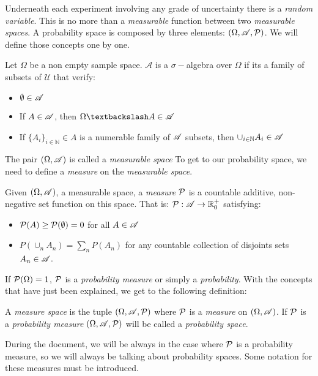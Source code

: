 
Underneath each experiment involving any grade of uncertainty there is a \emph{random variable}. This is no more than a \emph{measurable} function between two \emph{measurable spaces}.
A probability space is composed by three elements: $(\Omega, \mathscr{A}, \mathcal{P})$. We will define those concepts one by one.

\begin{ndef}Let $\Omega$ be a non empty sample space. $\mathcal A$ is a $\sigma-$algebra over $\Omega$ if its a family of subsets of $\mathcal U$ that verify:
\begin{itemize}
  \item $\emptyset \in \mathscr{A}$
  \item If $A \in \mathscr{A}$, then $\Omega \textbackslash A \in \Alg$
  \item If $\{A_i\}_{i \in \mathbb N} \in A$ is a numerable family of $\mathscr{A}$ subsets, then $\cup_{i \in \mathbb N} A_i \in \mathscr{A}$
\end{itemize}
\end{ndef}


The pair $(\Omega,\mathscr{A})$ is called a \emph{measurable space} To get to our probability space, we need to define a \emph{measure} on the \emph{measurable space}.

\begin{ndef}
Given $(\Omega,\mathscr{A})$, a measurable space, a \emph{measure} $\mathcal{P}$ is a countable additive, non-negative set function on this space. That is: $\mathcal{P}: \mathscr{A} \to \mathbb R_0^+$ satisfying:
\begin{itemize}
  \item $\mathcal{P}(A) \geq \mathcal{P}(\emptyset) = 0$ for all $A \in \mathscr{A}$
  \item $P(\cup_n A_n) = \sum_n P(A_n)$ for any countable collection of disjoints sets $A_n \in \mathscr{A}$.
\end{itemize}
\end{ndef}

If $\mathcal{P}(\Omega) = 1$, $\mathcal{P}$ is a \emph{probability measure} or simply a \emph{probability}. With the concepts that have just been explained, we get to the following definition:

\begin{ndef}
A \emph{measure space} is the tuple $(\Omega, \mathscr{A},\mathcal{P})$ where $\mathcal{P}$ is a \emph{measure} on $(\Omega, \mathscr{A})$. If $\mathcal{P}$ is a \emph{probability measure} $(\Omega,\mathscr{A},\mathcal{P})$ will be called a \emph{probability space}.
\end{ndef}

During the document, we will be always in the case where $\mathcal{P}$ is a probability measure, so we will always be talking about probability spaces. Some notation for these measures must be introduced.

